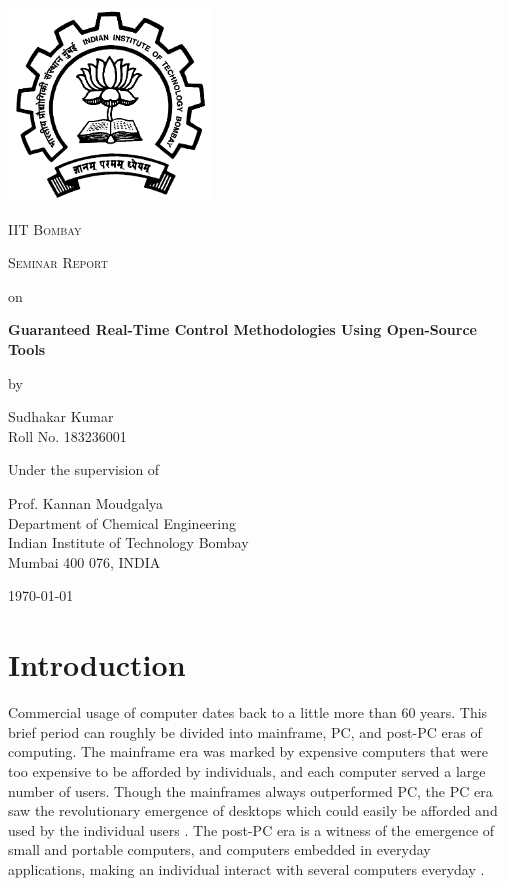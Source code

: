 \documentclass[12pt]{report}
\begin{document}


\begin{titlepage}
	\centering
	\includegraphics[width=0.4\textwidth]{images/iitb1.png}\par\vspace{1cm}
	{\scshape\LARGE IIT Bombay \par}
	\vspace{1cm}
	{\scshape\Large Seminar Report\par}
	\vspace{0.5cm}
	{\Large on \par}
	\vspace{0.5cm}
	{\huge\bfseries Guaranteed Real-Time Control Methodologies Using Open-Source Tools\par}
	\vspace{0.5cm}
	{\Large by \par}
	\vspace{0.5cm}
	{\Large Sudhakar Kumar \\ Roll No. 183236001 \par}
	\vfill
	\large{Under the supervision of}\par
	\Large{Prof. Kannan Moudgalya \\ Department of Chemical Engineering \\ Indian Institute of Technology Bombay \\ Mumbai 400 076, INDIA}

	\vfill

	{\large \today\par}
\end{titlepage}
\tableofcontents
\listoffigures

\chapter{Introduction}
Commercial usage of computer dates back to a little more than 60 years. This brief period can roughly be divided into mainframe, PC, and post-PC eras of computing. The mainframe era was marked by expensive computers that were too expensive to be afforded by individuals, and each computer served a large number of users. Though the mainframes always outperformed PC, the PC era saw the revolutionary emergence of desktops which could easily be afforded and used by the individual users \cite{framevspc}. The post-PC era is a witness of the emergence of small and portable computers, and computers embedded in everyday applications, making an individual interact with several computers everyday \cite{NPTEL}.\\
\end{document}

